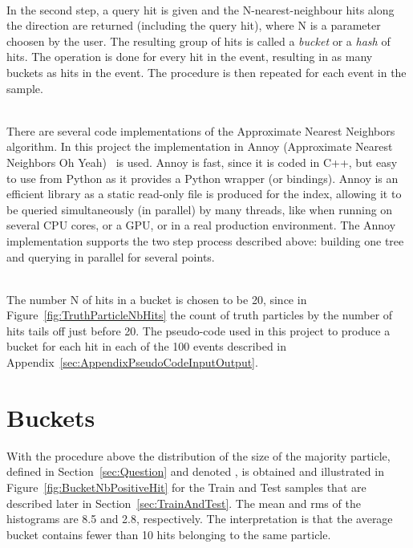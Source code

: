 \ \\In the second step, a query hit is given and the N-nearest-neighbour hits along the direction are returned (including the query hit), where N is a parameter choosen by the user. The resulting group of hits is called a \emph{bucket} or a \emph{hash} of hits. The operation is done for every hit in the event, resulting in as many buckets as hits in the event. The procedure is then repeated for each event in the sample.

\ \\There are several code implementations of the Approximate Nearest Neighbors algorithm. In this project the implementation in Annoy (Approximate Nearest Neighbors Oh Yeah)~\cite{Annoy} is used. Annoy is fast, since it is coded in C++, but easy to use from Python as it provides a Python wrapper (or bindings). Annoy is an efficient library as a static read-only file is produced for the index, allowing it to be queried simultaneously (in parallel) by many threads, like when running on several CPU cores, or a GPU, or in a real production environment. The Annoy implementation supports the two step process described above: building one tree and querying in parallel for several points.

\ \\The number N of hits in a bucket is chosen to be 20, since in Figure~\ref{fig:TruthParticleNbHits} the count of truth particles by the number of hits tails off just before 20. The pseudo-code used in this project to produce a bucket for each hit in each of the 100 events described in Appendix~\ref{sec:AppendixPseudoCodeInputOutput}.

\section{Buckets}
\label{sec:Buckets}

With the procedure above the distribution of the size of the majority particle, defined in Section~\ref{sec:Question} and denoted \nbPositiveHit, is obtained and illustrated in Figure~\ref{fig:BucketNbPositiveHit} for the Train and Test samples that are described later in Section~\ref{sec:TrainAndTest}. The mean and rms of the histograms are 8.5 and 2.8, respectively. The interpretation is that the average bucket contains fewer than 10 hits belonging to the same particle.  

